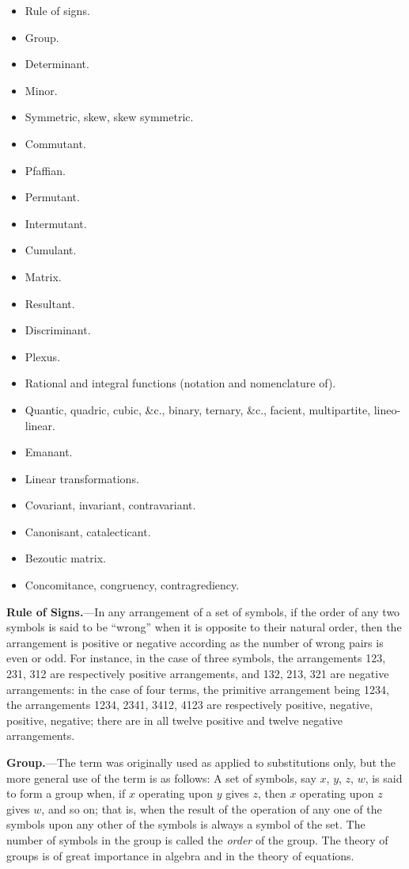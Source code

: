 \documentclass[12pt,a4paper]{article}
\theoremstyle{definition}
\begin{document}
\begin{itemize}[leftmargin=2em]
\item Rule of signs.
\item Group.
\item Determinant.
\item Minor.
\item Symmetric, skew, skew symmetric.
\item Commutant.
\item Pfaffian.
\item Permutant.
\item Intermutant.
\item Cumulant.
\item Matrix.
\item Resultant.
\item Discriminant.
\item Plexus.
\item Rational and integral functions (notation and nomenclature of).
\item Quantic, quadric, cubic, \&c., binary, ternary, \&c., facient, multipartite, lineo-linear.
\item Emanant.
\item Linear transformations.
\item Covariant, invariant, contravariant.
\item Canonisant, catalecticant.
\item Bezoutic matrix.
\item Concomitance, congruency, contragrediency.
\end{itemize}

\vspace{1em}

\noindent\textbf{Rule of Signs.}---In any arrangement of a set of symbols, if the order of any two symbols is said to be ``wrong'' when it is opposite to their natural order, then the arrangement is positive or negative according as the number of wrong pairs is even or odd. For instance, in the case of three symbols, the arrangements 123, 231, 312 are respectively positive arrangements, and 132, 213, 321 are negative arrangements: in the case of four terms, the primitive arrangement being 1234, the arrangements 1234, 2341, 3412, 4123 are respectively positive, negative, positive, negative; there are in all twelve positive and twelve negative arrangements.

\vspace{1em}

\noindent\textbf{Group.}---The term was originally used as applied to substitutions only, but the more general use of the term is as follows: A set of symbols, say $x$, $y$, $z$, $w$, is said to form a group when, if $x$ operating upon $y$ gives $z$, then $x$ operating upon $z$ gives $w$, and so on; that is, when the result of the operation of any one of the symbols upon any other of the symbols is always a symbol of the set. The number of symbols in the group is called the \textit{order} of the group. The theory of groups is of great importance in algebra and in the theory of equations.
\end{document}
